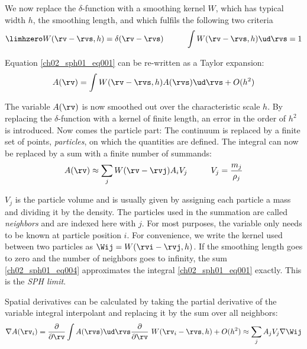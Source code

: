 We now replace the $\delta$-function with a smoothing kernel $W$, which has typical width $h$, the smoothing length, and which fulfils the following two criteria
\begin{equation}
\label{ch02_sph01_eq002}
\limhzero W(\rv - \rvs, h) = \delta(\rv - \rvs) \hspace{1.0cm}
\int W(\rv - \rvs, h) \ud \rvs = 1
\end{equation}

Equation \ref{ch02_sph01_eq001} can be re-written as a Taylor expansion:
\begin{equation}
\label{ch02_sph01_eq003}
A(\rv) = \int  W(\rv - \rvs, h) A(\rvs) \ud \rvs + O(h^2)
\end{equation}

The variable $A(\rv)$ is now smoothed out over the characteristic scale $h$. By replacing the $\delta$-function with a kernel of finite length, an error in the order of $h^2$ is introduced. Now comes the particle part: The continuum is replaced by a finite set of points, \emph{particles}, on which the quantities are defined. The integral can now be replaced by a sum with a finite number of summands:
\begin{equation}
\label{ch02_sph01_eq004}
A(\rv) \approx \sum_{j} W(\rv - \rvj) A_i V_{j} \hspace{1.0cm} V_{j} = \frac{m_j}{\rho_j}
\end{equation}

$V_{j}$ is the particle volume and is usually given by assigning each particle a mass and dividing it by the density. The particles used in the summation are called \emph{neighbors} and are indexed here with $j$. For most purposes, the variable only needs to be known at particle position $i$. For convenience, we write the kernel used between two particles as $\Wij = W( \rvi - \rvj, h)$. If the smoothing length goes to zero and the number of neighbors goes to infinity, the sum \ref{ch02_sph01_eq004} approximates the integral \ref{ch02_sph01_eq001} exactly. This is the \emph{SPH limit}.

Spatial derivatives can be calculated by taking the partial derivative of the variable integral interpolant  and replacing it by the sum over all neighbors:
\begin{equation}
\label{ch02_sph01_eq005}
\nabla A(\rv_i) = \frac{\partial}{\partial \rv}\int A(\rvs) \ud \rvs \frac{\partial}{\partial \rv}\ W(\rv_i - \rvs, h) + O(h^2)
\approx \sum_{j} A_j V_{j} \nabla \Wij 
\end{equation}

